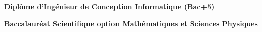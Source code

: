 %
%
%


\begin{scholarship}
					{\textbf{Diplôme d'Ingénieur de Conception Informatique (Bac+5)}}
	
					{\textbf{Baccalauréat Scientifique option Mathématiques et Sciences Physiques}}
\end{scholarship}